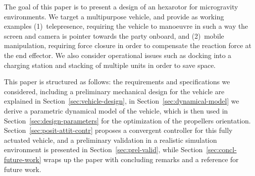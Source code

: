 The goal of this paper is to present a design of an hexarotor for
microgravity environments. We target a multipurpose vehicle, and
provide as working examples (1)~telepresence, requiring the vehicle to
manoeuvre in such a way the screen and camera is pointer towards the
party onboard, and (2)~mobile manipulation, requiring force closure in
order to compensate the reaction force at the end effector. We also
consider operational issues such as docking into a charging station
and stacking of multiple units in order to save space.

This paper is structured as follows: the requirements and
specifications we considered, including a preliminary mechanical
design for the vehicle are explained in
Section~\ref{sec:vehicle-design}, in Section~\ref{sec:dynamical-model} we
derive a parametric dynamical model of the vehicle, which is then used
in Section~\ref{sec:design-parameters} for the optimization of the
propellers orientation. Section~\ref{sec:posit-attit-contr} proposes a
convergent controller for this fully actuated vehicle, and a
preliminary validation in a realistic simulation environment is
presented in Section~\ref{sec:prel-valid}, while
Section~\ref{sec:concl-future-work} wraps up the paper with concluding
remarks and a reference for future work.


